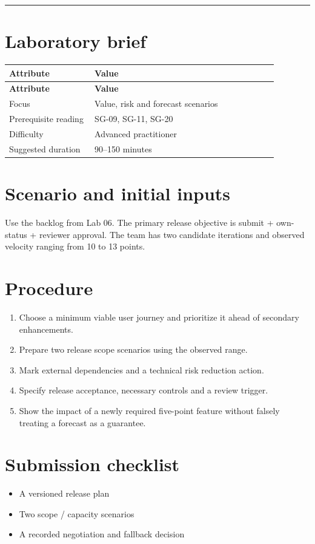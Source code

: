 \documentclass[11pt,letterpaper]{article}
\begin{document}
\tableofcontents\medskip\noindent\rule{\linewidth}{0.4pt}\medskip
\section{Laboratory brief}
\begin{longtable}{|p{0.28\linewidth}|p{0.60\linewidth}|}\hline
\textbf{Attribute} & \textbf{Value} \\ \hline\endfirsthead\hline
\textbf{Attribute} & \textbf{Value} \\ \hline\endhead
Focus & Value, risk and forecast scenarios \\ \hline
Prerequisite reading & SG-09, SG-11, SG-20 \\ \hline
Difficulty & Advanced practitioner \\ \hline
Suggested duration & 90–150 minutes \\ \hline
\end{longtable}
\section{Scenario and initial inputs}
Use the backlog from Lab 06. The primary release objective is submit + own-status + reviewer approval. The team has two candidate iterations and observed velocity ranging from 10 to 13 points.

\section{Procedure}
\begin{enumerate}[leftmargin=*,itemsep=3pt]
\item Choose a minimum viable user journey and prioritize it ahead of secondary enhancements.
\item Prepare two release scope scenarios using the observed range.
\item Mark external dependencies and a technical risk reduction action.
\item Specify release acceptance, necessary controls and a review trigger.
\item Show the impact of a newly required five-point feature without falsely treating a forecast as a guarantee.
\end{enumerate}
\section{Submission checklist}
\begin{itemize}[leftmargin=*,itemsep=2pt]
\item A versioned release plan
\item Two scope / capacity scenarios
\item A recorded negotiation and fallback decision
\end{itemize}
\end{document}
